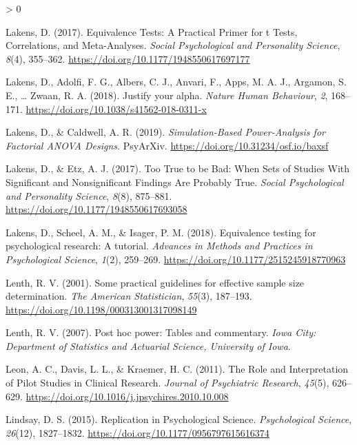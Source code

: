 \documentclass[
  english,
  ,jou, a4paper,floatsintext]{apa6}
\newlength{\cslhangindent}
\newenvironment{CSLReferences}[2] %
 {%
  \setlength{\parindent}{0pt}
  \ifodd #1 \everypar{\setlength{\hangindent}{\cslhangindent}}\ignorespaces\fi
  \ifnum #2 > 0
  \setlength{\parskip}{#2\baselineskip}
  \fi
 }%
 {}
\begin{document}
\begin{CSLReferences}{1}{0}
\leavevmode\hypertarget{ref-lakens_equivalence_2017}{}%
Lakens, D. (2017). Equivalence {Tests}: A {Practical Primer} for t {Tests}, {Correlations}, and {Meta}-{Analyses}. \emph{Social Psychological and Personality Science}, \emph{8}(4), 355--362. \url{https://doi.org/10.1177/1948550617697177}

\leavevmode\hypertarget{ref-lakens_justify_2018}{}%
Lakens, D., Adolfi, F. G., Albers, C. J., Anvari, F., Apps, M. A. J., Argamon, S. E., \ldots{} Zwaan, R. A. (2018). Justify your alpha. \emph{Nature Human Behaviour}, \emph{2}, 168--171. \url{https://doi.org/10.1038/s41562-018-0311-x}

\leavevmode\hypertarget{ref-lakens_simulation-based_2019}{}%
Lakens, D., \& Caldwell, A. R. (2019). \emph{Simulation-{Based Power}-{Analysis} for {Factorial ANOVA Designs}}. {PsyArXiv}. \url{https://doi.org/10.31234/osf.io/baxsf}

\leavevmode\hypertarget{ref-lakens_too_2017}{}%
Lakens, D., \& Etz, A. J. (2017). Too {True} to be {Bad}: When {Sets} of {Studies With Significant} and {Nonsignificant Findings Are Probably True}. \emph{Social Psychological and Personality Science}, \emph{8}(8), 875--881. \url{https://doi.org/10.1177/1948550617693058}

\leavevmode\hypertarget{ref-lakens_equivalence_2018}{}%
Lakens, D., Scheel, A. M., \& Isager, P. M. (2018). Equivalence testing for psychological research: A tutorial. \emph{Advances in Methods and Practices in Psychological Science}, \emph{1}(2), 259--269. \url{https://doi.org/10.1177/2515245918770963}

\leavevmode\hypertarget{ref-lenth_practical_2001}{}%
Lenth, R. V. (2001). Some practical guidelines for effective sample size determination. \emph{The American Statistician}, \emph{55}(3), 187--193. \url{https://doi.org/10.1198/000313001317098149}

\leavevmode\hypertarget{ref-lenth_post_2007}{}%
Lenth, R. V. (2007). Post hoc power: Tables and commentary. \emph{Iowa City: Department of Statistics and Actuarial Science, University of Iowa}.

\leavevmode\hypertarget{ref-leon_role_2011}{}%
Leon, A. C., Davis, L. L., \& Kraemer, H. C. (2011). The {Role} and {Interpretation} of {Pilot Studies} in {Clinical Research}. \emph{Journal of Psychiatric Research}, \emph{45}(5), 626--629. \url{https://doi.org/10.1016/j.jpsychires.2010.10.008}

\leavevmode\hypertarget{ref-lindsay_replication_2015}{}%
Lindsay, D. S. (2015). Replication in {Psychological Science}. \emph{Psychological Science}, \emph{26}(12), 1827--1832. \url{https://doi.org/10.1177/0956797615616374}


\end{CSLReferences}
\end{document}

